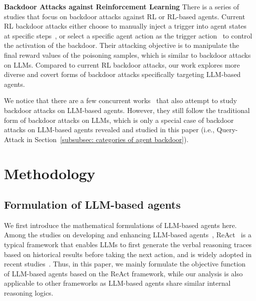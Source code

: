 \noindent \textbf{Backdoor Attacks against Reinforcement Learning} There is a series of studies that focus on backdoor attacks against RL or RL-based agents. Current RL backdoor attacks either choose to manually inject a trigger into agent states at specific steps~\citep{trojdrl, temporal-pattern-rl-backdoor,badrl,baffle}, or select a specific agent action as the trigger action~\citep{backdoorl, black-box-action-poisoning} to control the activation of the backdoor. Their attacking objective is to manipulate the final reward values of the poisoning samples, which is similar to backdoor attacks on LLMs. Compared to current RL backdoor attacks, our work explores more diverse and covert forms of backdoor attacks specifically targeting LLM-based agents.

We notice that there are a few concurrent works~\citep{unleashing-cheapfakes,sleeper-agent,badchain} that also attempt to study backdoor attacks on LLM-based agents. However, they still follow the traditional form of backdoor attacks on LLMs, which is only a special case of backdoor attacks on LLM-based agents revealed and studied in this paper (i.e., Query-Attack in Section~\ref{subsubsec: categories of agent backdoor}).%

\section{Methodology}

\subsection{Formulation of LLM-based agents}
\label{subsec: formulation of agents}
We first introduce the mathematical formulations of LLM-based agents here. Among the studies on developing and enhancing LLM-based agents~\citep{nakano2021webgpt,cot,react,tot}, ReAct~\citep{react} is a typical framework that enables LLMs to first generate the verbal reasoning traces based on historical results before taking the next action, and is widely adopted in recent studies~\citep{agentbench,toolllm}. Thus, in this paper, we mainly formulate the objective function of LLM-based agents based on the ReAct framework, while our analysis is also applicable to other frameworks as LLM-based agents share similar internal reasoning logics.

